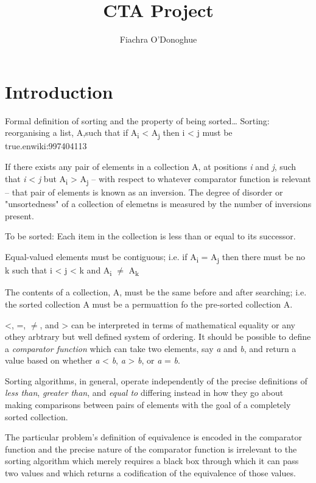 \documentclass[12pt, a4paper]{article}
\title{CTA Project}
\author{Fiachra O'Donoghue}
\begin{document}
    
\section{Introduction}




Formal definition of sorting and the property of being sorted\dots
Sorting: reorganising a list, A,such that if A\textsubscript{i} < A\textsubscript{j} then i < j must be true.enwiki:997404113


If there exists any pair of elements in a collection A, at positions \emph{i} and \emph{j}, such that \emph{i} < \emph{j} but A\textsubscript{i} > A\textsubscript{j} -- with respect to whatever comparator function is relevant -- that pair of elements is known as an inversion. The degree of disorder or "unsortedness" of a collection of elemetns is measured by the number of inversions present.

To be sorted: Each item in the collection is less than or equal to its successor.

Equal-valued elements must be contiguous; i.e. if A\textsubscript{i} = A\textsubscript{j} then there must be no k such that i < j < k and A\textsubscript{i} $\ne$ A\textsubscript{k}

The contents of a collection, A, must be the same before and after searching; i.e. the sorted collection A must be a permuattion fo the pre-sorted collection A.

<, =, $\ne$, and > can be interpreted in terms of mathematical equality or any othey arbtrary but well defined system of ordering. It should be possible to define a \emph{comparator function} which can take two elements, say \emph{a} and \emph{b}, and return a value based on whether \emph{a} < \emph{b}, \emph{a} > \emph{b}, or \emph{a} = \emph{b}.

Sorting algorithms, in general, operate independently of the precise definitions of \emph{less than}, \emph{greater than}, and \emph{equal to} differing instead in how they go about making comparisons between pairs of elements with the goal of a completely sorted collection.

The particular problem's definition of equivalence is encoded in the comparator function and the precise nature of the comparator function is irrelevant to the sorting algorithm which merely requires a black box through which it can pass two values and which returns a codification of the equivalence of those values.
\end{document}

